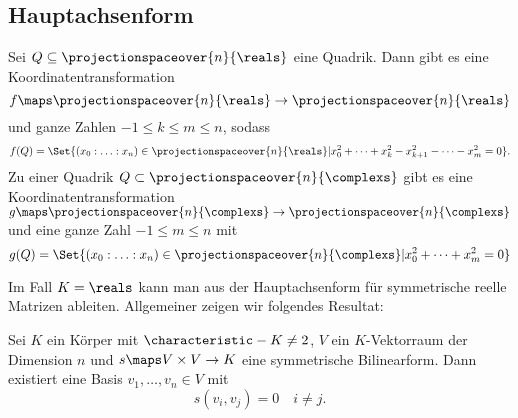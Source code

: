 \subsection*{Hauptachsenform}
\begin{satz}\label{projektive_quadriken_hauptachsenform}
  Sei \( Q\subseteq \projectionspaceover{n}{\reals} \) eine Quadrik. Dann gibt es eine Koordinatentransformation
  \begin{equation*}
    f\maps \projectionspaceover{n}{\reals}\to\projectionspaceover{n}{\reals}
  \end{equation*}
  und ganze Zahlen \( -1\leq k\leq m\leq n \), sodass
  \begin{equation*}
    f(Q)=\Set{(x_0:\dotsc:x_n)\in \projectionspaceover{n}{\reals}|x_0^2+\dotsb+x_k^2-x_{k+1}^2-\dotsb-x_m^2=0}.
  \end{equation*}
  Zu einer Quadrik \( Q\subset \projectionspaceover{n}{\complexs} \) gibt es eine Koordinatentransformation \( g\maps \projectionspaceover{n}{\complexs}\to \projectionspaceover{n}{\complexs} \) und eine ganze Zahl \( -1\leq m\leq n \) mit
  \begin{equation*}
    g(Q)=\Set{(x_0:\dotsc:x_n)\in \projectionspaceover{n}{\complexs}|x_0^2+\dotsb+x_m^2=0}
  \end{equation*}
  
\end{satz}
\begin{bemerkung*}
  Im Fall \( K=\reals \) kann man  aus der Hauptachsenform für symmetrische reelle Matrizen ableiten. Allgemeiner zeigen wir folgendes Resultat:
\end{bemerkung*}
\begin{lemma}\label{symmetrische_bilinearform_diagonalisierung}
  Sei \( K \) ein Körper mit \( \characteristic-{K}\neq 2 \), \( V \) ein \( K \)-Vektorraum der Dimension \( n \) und \( s\maps V\times V\to K \) eine symmetrische Bilinearform. Dann existiert eine Basis \( v_1,\dotsc,v_n\in V \) mit 
  \begin{equation*}
    s(v_i,v_j)=0\quad i\neq j.
  \end{equation*}
\end{lemma}
